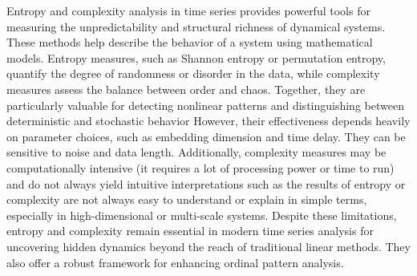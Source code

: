 Entropy and complexity analysis in time series provides powerful tools for measuring the unpredictability and structural richness of dynamical systems. 
These methods help describe the behavior of a system using mathematical models. 
Entropy measures, 
such as Shannon entropy or permutation entropy, 
quantify the degree of randomness or disorder in the data, while complexity measures assess the balance between order and chaos. 
Together, they are particularly valuable for detecting nonlinear patterns and distinguishing between deterministic and stochastic behavior 
However, their effectiveness depends heavily on parameter choices, such as embedding dimension and time delay. 
They can be sensitive to noise and data length. 
Additionally, complexity measures may be computationally intensive (it requires a lot of processing power or time to run) and do not always yield intuitive interpretations such as the results of entropy or complexity are not always easy to understand or explain in simple terms, especially in high-dimensional or multi-scale systems.
Despite these limitations, entropy and complexity remain essential in modern time series analysis for uncovering hidden dynamics beyond the reach of traditional linear methods. 
They also offer a robust framework for enhancing ordinal pattern analysis.


